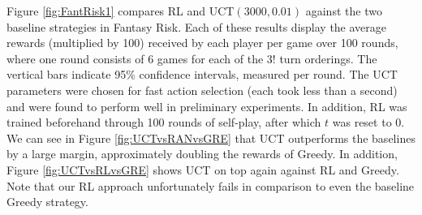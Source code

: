 \documentclass[letterpaper]{article}
\numberwithin{equation}{section}
\numberwithin{theorem}{section}
\numberwithin{lemma}{section}
\numberwithin{df}{section}
\begin{document}
Figure \ref{fig:FantRisk1} compares RL and UCT$(3000, 0.01)$ against the two baseline strategies in Fantasy Risk.  Each of these results display the average rewards (multiplied by 100) received by each player per game over 100 rounds, where one round consists of 6 games for each of the $3!$ turn orderings.  The vertical bars indicate 95\% confidence intervals, measured per round.  The UCT parameters were chosen for fast action selection (each took less than a second) and were found to perform well in preliminary experiments.  In addition, RL was trained beforehand through 100 rounds of self-play, after which $t$ was reset to 0.  We can see in Figure \ref{fig:UCTvsRANvsGRE} that UCT outperforms the baselines by a large margin, approximately doubling the rewards of Greedy.  In addition, Figure \ref{fig:UCTvsRLvsGRE} shows UCT on top again against RL and Greedy.  Note that our RL approach unfortunately fails in comparison to even the baseline Greedy strategy.
\end{document}
